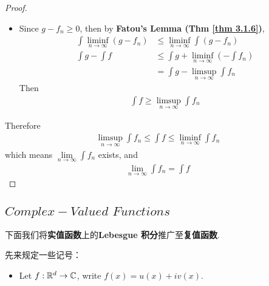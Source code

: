 \begin{thm}
\begin{proof}
\begin{itemize}
 				\item Since $g - f_n \geq 0$, then by \textbf{Fatou's Lemma (Thm \ref{thm 3.1.6})},
 				\begin{align}
 					\int{\liminf_{n \to \infty}{(g - f_n)}} &\leq \liminf_{n \to \infty}{\int{(g - f_n)}} \\
 					\int{g} - \int{f} &\leq \int{g} + \liminf_{n \to \infty}{(-\int{f_n})} \\
 					&= \int{g} - \limsup_{n \to \infty}{\int{f_n}}
 				\end{align}
 				Then
 				\begin{align}
 					\int{f} \geq \limsup_{n \to \infty}{\int{f_n}}
 				\end{align}
 			\end{itemize}
 			Therefore
 			\begin{align}
 				\limsup_{n \to \infty}{\int{f_n}} \leq \int{f} \leq \liminf_{n \to \infty}{\int{f_n}}
 			\end{align}
 			which means $\underset{n \to \infty}{\lim}{\int{f_n}}$ exists, and
 			\begin{align}
 				\lim_{n \to \infty}{\int{f_n}} = \int{f}
 			\end{align}
 		\end{proof}
 	\end{thm}
 
 \newpage
 \subsection{$Complex-Valued \,\, Functions$}
 \begin{center}
 	下面我们将\textbf{实值函数}上的\textbf{Lebesgue 积分}推广至\textbf{复值函数}.
 \end{center}
 	
 	先来规定一些记号：
 	\begin{itemize}
 		\item Let $f : \mathbb{R}^d \rightarrow \mathbb{C}$, write $f(x) = u(x) + i v(x)$.
 	\end{itemize}
 	
